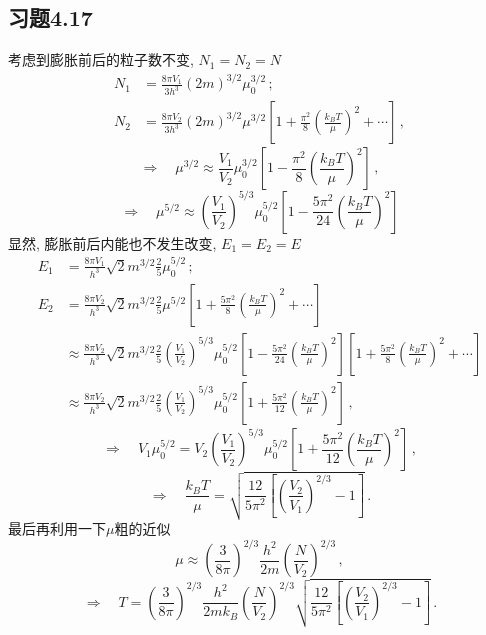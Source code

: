 \documentclass[letterpaper, 10pt]{article}
\begin{document}
\subsection{习题4.17}
考虑到膨胀前后的粒子数不变, $N_{1} = N_{2} = N$
\begin{align*}
N_{1} & = \frac{8 \pi V_{1}}{3 h^3} (2m)^{3/2} \mu_{0}^{3/2} \,; \\
N_{2} & = \frac{8 \pi V_{2}}{3 h^3} (2m)^{3/2} \mu^{3/2} \left[ 1 + \frac{\pi^2}{8}\left( \frac{k_{B} T}{\mu} \right)^2 + \cdots \right] \,,
\end{align*}
\[ \Rightarrow \quad{} \mu^{3/2} \approx \frac{V_1}{V_2} \mu_{0}^{3/2} \left[ 1 - \frac{\pi^2}{8} \left( \frac{k_{B} T}{\mu} \right)^2 \right] \,, \]
\[ \Rightarrow \quad{} \mu^{5/2} \approx \left( \frac{V_{1}}{V_{2}} \right)^{5/3} \mu_{0}^{5/2} \left[ 1 - \frac{5\pi^2}{24} \left( \frac{k_{B} T}{\mu} \right)^{2} \right] \]
显然, 膨胀前后内能也不发生改变, $E_{1} = E_{2} = E$
\begin{align*}
E_{1} & = \frac{8\pi V_{1}}{h^{3}} \sqrt{2} m^{3/2} \frac{2}{5} \mu_{0}^{5/2} \,; \\
E_{2} & = \frac{8\pi V_{2}}{h^{3}} \sqrt{2} m^{3/2} \frac{2}{5} \mu^{5/2} \left[ 1 + \frac{5\pi^{2}}{8} \left( \frac{k_{B}T}{\mu} \right)^{2} + \cdots \right] \\
& \approx \frac{8\pi V_{2}}{h^{3}} \sqrt{2} m^{3/2} \frac{2}{5} \left( \frac{V_{1}}{V_{2}} \right)^{5/3} \mu_{0}^{5/2} \left[ 1 - \frac{5\pi^2}{24} \left( \frac{k_{B} T}{\mu} \right)^{2} \right] \left[ 1 + \frac{5\pi^{2}}{8} \left( \frac{k_{B}T}{\mu} \right)^{2} + \cdots \right] \\
& \approx \frac{8\pi V_{2}}{h^{3}} \sqrt{2} m^{3/2} \frac{2}{5} \left( \frac{V_{1}}{V_{2}} \right)^{5/3} \mu_{0}^{5/2} \left[ 1 + \frac{5\pi^{2}}{12} \left( \frac{k_{B}T}{\mu} \right)^{2} \right] \,,
\end{align*}
\[ \Rightarrow \quad{} V_{1} \mu_{0}^{5/2} = V_{2} \left( \frac{V_{1}}{V_{2}} \right)^{5/3} \mu_{0}^{5/2} \left[ 1 + \frac{5\pi^{2}}{12} \left( \frac{k_{B}T}{\mu} \right)^{2} \right] \,, \]
\[ \Rightarrow \quad{} \frac{k_{B}T}{\mu} = \sqrt{ \frac{12}{5\pi^{2}} \left[ \left( \frac{V_{2}}{V_{1}} \right)^{2/3} - 1 \right] }\,. \]
最后再利用一下$\mu$粗的近似
\[ \mu \approx \left( \frac{3}{8\pi} \right)^{2/3} \frac{h^{2}}{2m} \left(\frac{N}{V_{2}} \right)^{2/3}\,, \]
\[ \Rightarrow \quad{} T = \left( \frac{3}{8\pi} \right)^{2/3} \frac{h^{2}}{2mk_{B}} \left(\frac{N}{V_{2}} \right)^{2/3} \sqrt{ \frac{12}{5\pi^{2}} \left[ \left( \frac{V_{2}}{V_{1}} \right)^{2/3} - 1 \right] }\,. \]
\end{document}
